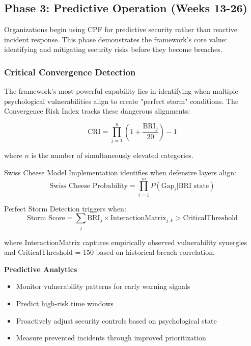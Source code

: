 \documentclass[11pt,a4paper]{article}
\begin{document}
\subsection{Phase 3: Predictive Operation (Weeks 13-26)}

Organizations begin using CPF for predictive security rather than reactive incident response. This phase demonstrates the framework's core value: identifying and mitigating security risks before they become breaches.

\subsubsection{Critical Convergence Detection}

The framework's most powerful capability lies in identifying when multiple psychological vulnerabilities align to create "perfect storm" conditions. The Convergence Risk Index tracks these dangerous alignments:

\begin{equation}
\text{CRI} = \prod_{j=1}^{n} \left(1 + \frac{\text{BRI}_j}{20}\right) - 1
\end{equation}

where $n$ is the number of simultaneously elevated categories.

Swiss Cheese Model Implementation identifies when defensive layers align:
\begin{equation}
\text{Swiss Cheese Probability} = \prod_{i=1}^{m} P(\text{Gap}_i | \text{BRI state})
\end{equation}

Perfect Storm Detection triggers when:
\begin{equation}
\text{Storm Score} = \sum_{j} \text{BRI}_j \times \text{InteractionMatrix}_{j,k} > \text{CriticalThreshold}
\end{equation}

where InteractionMatrix captures empirically observed vulnerability synergies and CriticalThreshold = 150 based on historical breach correlation.

\textbf{Predictive Analytics}
\begin{itemize}
\item Monitor vulnerability patterns for early warning signals
\item Predict high-risk time windows
\item Proactively adjust security controls based on psychological state
\item Measure prevented incidents through improved prioritization
\end{itemize}
\end{document}
